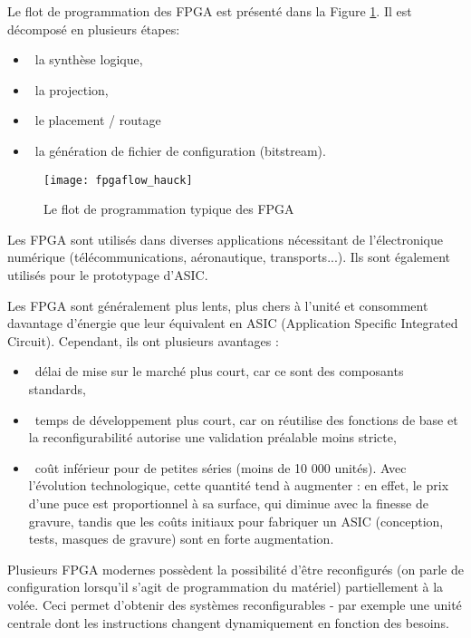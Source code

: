Le flot de programmation des FPGA est présenté dans la Figure \ref{fig:fpgaflow}. Il est décomposé
en plusieurs étapes:
\begin{itemize}
	\item\ la synthèse logique,
	\item\ la projection,
	\item\ le placement / routage
	\item\ la génération de fichier de configuration (bitstream).
\end{itemize}

\begin{figure}[h]
	\centering
	\texttt{[image: fpgaflow\_hauck]}
	\caption{Le flot de programmation typique des FPGA}
	\label{fig:fpgaflow}
	\vspace{-2mm}
\end{figure}

\justify
Les FPGA sont utilisés dans diverses applications nécessitant de l'électronique numérique (télécommunications, aéronautique, transports...).
Ils sont également utilisés pour le prototypage d'ASIC.

Les FPGA sont généralement plus lents, plus chers à l'unité et consomment davantage d'énergie 
que leur équivalent en ASIC (Application Specific Integrated Circuit). Cependant, ils ont plusieurs avantages :
\begin{itemize}
    \item\ délai de mise sur le marché plus court, car ce sont des composants standards,
    \item\ temps de développement plus court, car on réutilise des fonctions de base et 
	    la reconfigurabilité autorise une validation préalable moins stricte,
    \item\ coût inférieur pour de petites séries (moins de 10 000 unités). 
	Avec l'évolution technologique, cette quantité tend à augmenter : en effet, le prix d'une puce est 
	proportionnel à sa surface, qui diminue avec la finesse de gravure, tandis que les coûts initiaux 
	pour fabriquer un ASIC (conception, tests, masques de gravure) sont en forte augmentation.
\end{itemize}

Plusieurs FPGA modernes possèdent la possibilité d'être reconfigurés 
(on parle de configuration lorsqu'il s'agit de programmation du matériel) partiellement à la volée. 
Ceci permet d'obtenir des systèmes reconfigurables - par exemple une unité centrale dont 
les instructions changent dynamiquement en fonction des besoins.

